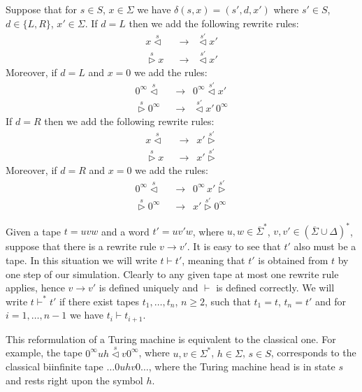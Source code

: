 \documentclass{article}
\newcommand{\lhead}[1]{\stackrel{#1}\triangleleft}
\newcommand{\rhead}[1]{\stackrel{#1}\triangleright}
\begin{document}
Suppose that for \( s \in S \), \( x \in \Sigma \) we have \( \delta(s, x) = (s', d, x') \) where \( s' \in S \), \( d \in \{ L, R \} \), \( x' \in \Sigma \).
If \( d = L \) then we add the following rewrite rules:
\begin{align*}
	x \lhead{s}\,\,\, &\to \,\,\, \lhead{s'} x'\\
	\rhead{s} x\,\,\, &\to \,\,\, \lhead{s'} x'
\end{align*}
Moreover, if \( d = L \) and \( x = 0 \) we add the rules:
\begin{align*}
	0^\infty \lhead{s}\,\,\, &\to \,\,\, 0^\infty \lhead{s'} x'\\
	\rhead{s} 0^\infty\,\,\, &\to \,\,\, \lhead{s'} x'\, 0^\infty
\end{align*}
If \( d = R \) then we add the following rewrite rules:
\begin{align*}
	x \lhead{s}\,\,\, &\to \,\,\, x' \rhead{s'}\\
	\rhead{s} x\,\,\, &\to \,\,\, x' \rhead{s'}
\end{align*}
Moreover, if \( d = R \) and \( x = 0 \) we add the rules:
\begin{align*}
	0^\infty \lhead{s}\,\,\, &\to \,\,\, 0^\infty \, x' \rhead{s'}\\
	\rhead{s} 0^\infty\,\,\, &\to \,\,\, x' \rhead{s'} 0^\infty
\end{align*}

Given a tape \( t = uvw \) and a word \( t' = uv'w \), where \( u, w \in \overline{\Sigma}^* \), \( v, v' \in (\overline{\Sigma} \cup \Delta)^* \),
suppose that there is a rewrite rule \( v \to v' \). It is easy to see that \( t' \) also must be a tape.
In this situation we will write \( t \vdash t' \), meaning that \( t' \) is obtained from \( t \) by one step of our simulation.
Clearly to any given tape at most one rewrite rule applies, hence \( v \to v' \) is defined uniquely and \( \vdash \) is defined correctly.
We will write \( t \vdash^* t' \) if there exist tapes \( t_1, \dots, t_n \), \( n \geq 2 \), such that \( t_1 = t \), \( t_n = t' \)
and for \( i = 1, \dots, n-1 \) we have \( t_i \vdash t_{i+1} \).

This reformulation of a Turing machine is equivalent to the classical one. For example, the tape \( 0^\infty uh \lhead{s} v 0^\infty \),
where \( u,v  \in \Sigma^* \), \( h \in \Sigma \), \( s \in S \), corresponds to the classical biinfinite tape \( \dots 0 uhv 0 \dots \),
where the Turing machine head is in state \( s \) and rests right upon the symbol \( h \).
\medskip
\end{document}
